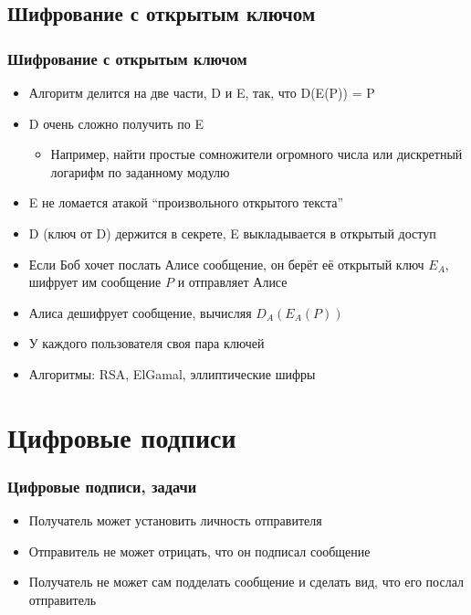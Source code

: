 \documentclass{../../slides-style}
\begin{document}
    \subsection{Шифрование с открытым ключом}

    \begin{frame}
        \frametitle{Шифрование с открытым ключом}
        \begin{itemize}
            \item Алгоритм делится на две части, D и E, так, что D(E(P)) = P
            \item D очень сложно получить по E
            \begin{itemize}
                \item Например, найти простые сомножители огромного числа или дискретный логарифм по заданному модулю
            \end{itemize}
            \item E не ломается атакой ``произвольного открытого текста''
            \item D (ключ от D) держится в секрете, E выкладывается в открытый доступ
            \item Если Боб хочет послать Алисе сообщение, он берёт её открытый ключ $E_A$, шифрует им сообщение $P$ и отправляет Алисе
            \item Алиса дешифрует сообщение, вычисляя $D_A(E_A(P))$
            \item У каждого пользователя своя пара ключей
            \item Алгоритмы: RSA, ElGamal, эллиптические шифры
        \end{itemize}
    \end{frame}

    \section{Цифровые подписи}

    \begin{frame}
        \frametitle{Цифровые подписи, задачи}
        \begin{itemize}
            \item Получатель может установить личность отправителя
            \item Отправитель не может отрицать, что он подписал сообщение
            \item Получатель не может сам подделать сообщение и сделать вид, что его послал отправитель
        \end{itemize}
    \end{frame}
\end{document}
